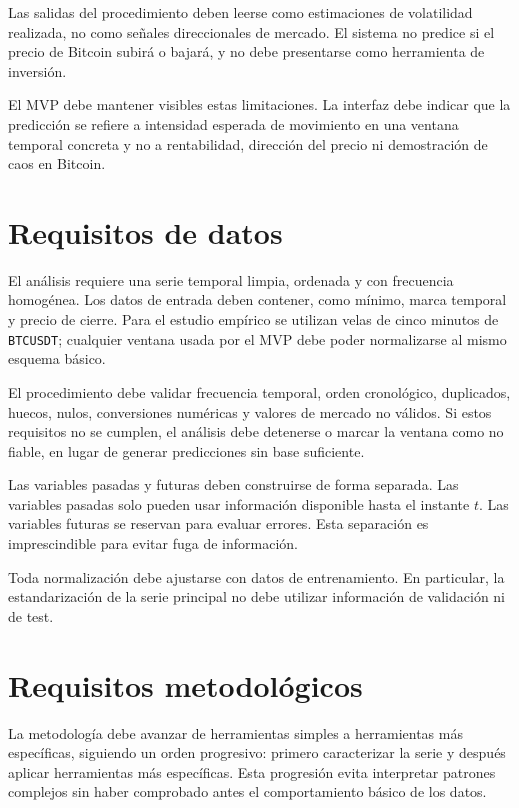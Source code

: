 Las salidas del procedimiento deben leerse como estimaciones de volatilidad realizada, no como señales direccionales de mercado. El sistema no predice si el precio de Bitcoin subirá o bajará, y no debe presentarse como herramienta de inversión.

El MVP debe mantener visibles estas limitaciones. La interfaz debe indicar que la predicción se refiere a intensidad esperada de movimiento en una ventana temporal concreta y no a rentabilidad, dirección del precio ni demostración de caos en Bitcoin.

\section{Requisitos de datos}\label{sec:requisitos-datos}

El análisis requiere una serie temporal limpia, ordenada y con frecuencia homogénea. Los datos de entrada deben contener, como mínimo, marca temporal y precio de cierre. Para el estudio empírico se utilizan velas de cinco minutos de \texttt{BTCUSDT}; cualquier ventana usada por el MVP debe poder normalizarse al mismo esquema básico.

El procedimiento debe validar frecuencia temporal, orden cronológico, duplicados, huecos, nulos, conversiones numéricas y valores de mercado no válidos. Si estos requisitos no se cumplen, el análisis debe detenerse o marcar la ventana como no fiable, en lugar de generar predicciones sin base suficiente.

Las variables pasadas y futuras deben construirse de forma separada. Las variables pasadas solo pueden usar información disponible hasta el instante \(t\). Las variables futuras se reservan para evaluar errores. Esta separación es imprescindible para evitar fuga de información.

Toda normalización debe ajustarse con datos de entrenamiento. En particular, la estandarización de la serie principal no debe utilizar información de validación ni de test.

\section{Requisitos metodológicos}\label{sec:requisitos-metodologicos}

La metodología debe avanzar de herramientas simples a herramientas más específicas, siguiendo un orden progresivo: primero caracterizar la serie y después aplicar herramientas más específicas. Esta progresión evita interpretar patrones complejos sin haber comprobado antes el comportamiento básico de los datos.

